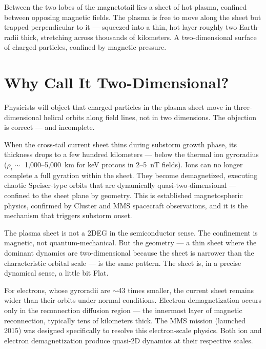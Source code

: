 
Between the two lobes of the magnetotail lies a sheet of hot plasma, confined between opposing magnetic fields. The plasma is free to move along the sheet but trapped perpendicular to it --- squeezed into a thin, hot layer roughly two Earth-radii thick, stretching across thousands of kilometers. A two-dimensional surface of charged particles, confined by magnetic pressure.

\section*{Why Call It Two-Dimensional?}
\label{spine:ws-quasi-2d}

Physicists will object that charged particles in the plasma sheet move in three-dimensional helical orbits along field lines, not in two dimensions. The objection is correct --- and incomplete.

When the cross-tail current sheet thins during substorm growth phase, its thickness drops to a few hundred kilometers --- below the thermal ion gyroradius ($\rho_i \sim$ 1,000--5,000~km for keV protons in 2--5~nT fields). Ions can no longer complete a full gyration within the sheet. They become demagnetized, executing chaotic Speiser-type orbits that are dynamically quasi-two-dimensional --- confined to the sheet plane by geometry. This is established magnetospheric physics, confirmed by Cluster and MMS spacecraft observations, and it is the mechanism that triggers substorm onset.

The plasma sheet is not a 2DEG in the semiconductor sense. The confinement is magnetic, not quantum-mechanical. But the geometry --- a thin sheet where the dominant dynamics are two-dimensional because the sheet is narrower than the characteristic orbital scale --- is the same pattern. The sheet is, in a precise dynamical sense, a little bit Flat.

For electrons, whose gyroradii are $\sim$43 times smaller, the current sheet remains wider than their orbits under normal conditions. Electron demagnetization occurs only in the reconnection diffusion region --- the innermost layer of magnetic reconnection, typically tens of kilometers thick. The MMS mission (launched 2015) was designed specifically to resolve this electron-scale physics. Both ion and electron demagnetization produce quasi-2D dynamics at their respective scales.

